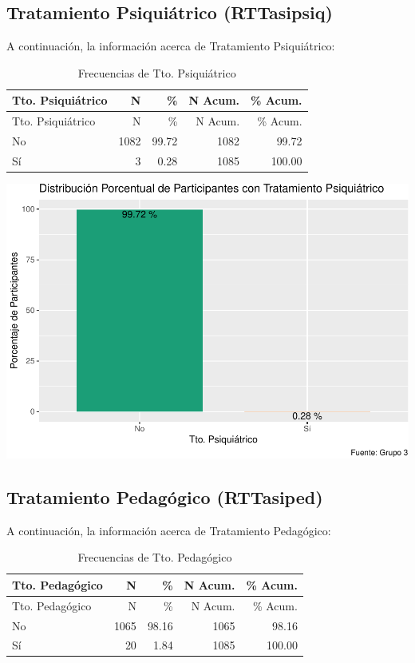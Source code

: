 \documentclass[
]{article}
\begin{document}
\subsection{Tratamiento Psiquiátrico
(RTTasipsiq)}\label{tratamiento-psiquiuxe1trico-rttasipsiq}

A continuación, la información acerca de Tratamiento Psiquiátrico:

\begin{longtable}[]{@{}lrrrr@{}}
\caption{Frecuencias de Tto. Psiquiátrico}\tabularnewline
\toprule\noalign{}
Tto. Psiquiátrico & N & \% & N Acum. & \% Acum. \\
\midrule\noalign{}
\endfirsthead
\toprule\noalign{}
Tto. Psiquiátrico & N & \% & N Acum. & \% Acum. \\
\midrule\noalign{}
\endhead
\bottomrule\noalign{}
\endlastfoot
No & 1082 & 99.72 & 1082 & 99.72 \\
Sí & 3 & 0.28 & 1085 & 100.00 \\
\end{longtable}

\includegraphics{Info_Dinix_02_files/figure-latex/30_RTTasipsiq-1.pdf}

\subsection{Tratamiento Pedagógico
(RTTasiped)}\label{tratamiento-pedaguxf3gico-rttasiped}

A continuación, la información acerca de Tratamiento Pedagógico:

\begin{longtable}[]{@{}lrrrr@{}}
\caption{Frecuencias de Tto. Pedagógico}\tabularnewline
\toprule\noalign{}
Tto. Pedagógico & N & \% & N Acum. & \% Acum. \\
\midrule\noalign{}
\endfirsthead
\toprule\noalign{}
Tto. Pedagógico & N & \% & N Acum. & \% Acum. \\
\midrule\noalign{}
\endhead
\bottomrule\noalign{}
\endlastfoot
No & 1065 & 98.16 & 1065 & 98.16 \\
Sí & 20 & 1.84 & 1085 & 100.00 \\
\end{longtable}
\end{document}
